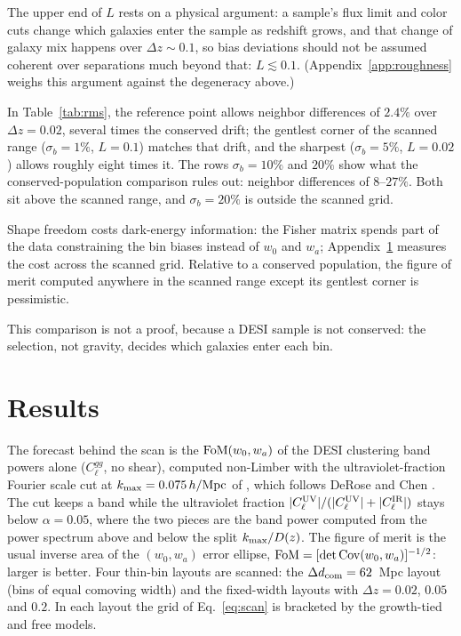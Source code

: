 \documentclass[11pt]{article}
\begin{document}
The upper end of $L$
rests on a physical argument: a sample's flux limit and color cuts change
which galaxies enter the sample as redshift grows, and that change of
galaxy mix happens over $\Delta z \sim 0.1$, so bias deviations should
not be assumed coherent over separations much beyond that:
$L \lesssim 0.1$.  (Appendix~\ref{app:roughness} weighs this argument
against the degeneracy above.)

In Table~\ref{tab:rms}, the reference point allows neighbor differences of
$2.4\%$ over $\Delta z = 0.02$, several times the conserved drift;
the gentlest corner of the scanned range ($\sigma_b = 1\%$,
$L = 0.1$) matches that drift, and the sharpest ($\sigma_b = 5\%$,
$L = 0.02$) allows roughly eight times it.  The rows
$\sigma_b = 10\%$ and $20\%$ show what the conserved-population
comparison rules out: neighbor differences of $8$--$27\%$.  Both sit
above the scanned range, and $\sigma_b = 20\%$ is outside the
scanned grid.

Shape freedom costs dark-energy information: the Fisher matrix spends
part of the data constraining the bin biases instead of $w_0$ and
$w_a$; Appendix~\ref{sec:results} measures the cost across the scanned
grid.  Relative to a conserved population, the figure of merit
computed anywhere in the scanned range except its gentlest corner
is pessimistic.

This comparison is not a proof, because a DESI sample is not
conserved: the selection, not gravity, decides which galaxies enter
each bin.

\section{Results}
\label{sec:results}

The forecast behind the scan is the ${\rm FoM}(w_0, w_a)$ of the DESI
clustering band powers alone ($C_\ell^{gg}$, no shear), computed
non-Limber with the ultraviolet-fraction Fourier scale cut at
$k_{\rm max} = 0.075\,h/{\rm Mpc}$ of \cite{Saraivanov2026}, which
follows DeRose and Chen \cite{DeRoseChen2025}.  The cut keeps a band
while the ultraviolet fraction
$|C_\ell^{\rm UV}|/(|C_\ell^{\rm UV}| + |C_\ell^{\rm IR}|)$ stays
below $\alpha = 0.05$, where the two pieces are the band power
computed from the power spectrum above and below the split
$k_{\rm max}/D(z)$.  The figure of merit is the usual inverse
area of the $(w_0, w_a)$ error ellipse,
${\rm FoM} = [\det \mathrm{Cov}(w_0, w_a)]^{-1/2}$: larger is better.
Four thin-bin layouts are scanned: the $\Delta d_{\rm com} = 62$~Mpc
layout (bins of equal comoving width) and the fixed-width layouts
with $\Delta z = 0.02$, $0.05$ and $0.2$.  In each layout the grid of
Eq.~\eqref{eq:scan} is bracketed by the growth-tied and free models.
\end{document}
